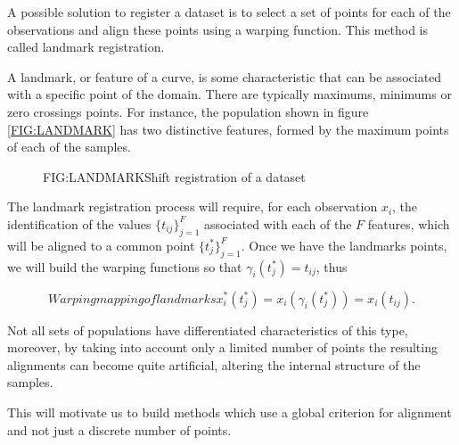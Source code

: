 A possible solution to register a dataset is to select a set of points for each
of the observations and align these points using a warping function. This method
 is called landmark registration.

A landmark, or feature of a curve, is some characteristic that can be
associated with a specific point of the domain. There are typically maximums, minimums or
zero crossings points. For instance, the population shown in figure
\ref{FIG:LANDMARK} has two distinctive features, formed by the maximum points of
 each of the samples.


\begin{figure}[Shift registration of a dataset]{FIG:LANDMARK}{Shift registration of a dataset}
   \quad
\end{figure}


The landmark registration process will require, for each observation $x_i$,
the identification of the values $\{t_{ij}\}_{j=1}^{F}$ associated with each of
the $F$ features, which will be aligned to a common point
$\{t_{j}^*\}_{j=1}^{F}$. Once we have the landmarks points, we will build the
 warping functions so that $\gamma_i(t_j^*)=t_{ij}$, thus

\begin{equation}[]{Warping mapping of landmarks}
x_i^*(t_j^*) = x_i(\gamma_i(t_j^*)) = x_i(t_{ij}).
\end{equation}

Not all sets of populations have differentiated characteristics of this type,
moreover, by taking into account only a limited number of points the resulting
alignments can become quite artificial, altering the internal structure of the
samples.

This will motivate us to build methods which use a global criterion for
alignment and not just a discrete number of points.
